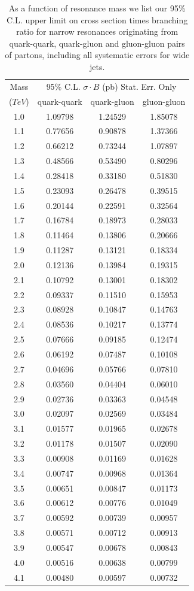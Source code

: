 \begin{table}[htbH]
\centering
\large
\begin{tabular}{|c|c|c|c|}\hline
Mass   &  \multicolumn{3}{c|}{95\% C.L. $\sigma\cdot B$ (pb) Stat. Err. Only}\\
 ($TeV$) & quark-quark       & quark-gluon  & gluon-gluon\\ \hline
1.0 & 1.09798 & 1.24529 & 1.85078 \\
1.1 & 0.77656 & 0.90878 & 1.37366 \\
1.2 & 0.66212 & 0.73244 & 1.07897 \\
1.3 & 0.48566 & 0.53490 & 0.80296 \\
1.4 & 0.28418 & 0.33180 & 0.51830 \\
1.5 & 0.23093 & 0.26478 & 0.39515 \\
1.6 & 0.20144 & 0.22591 & 0.32564 \\
1.7 & 0.16784 & 0.18973 & 0.28033 \\
1.8 & 0.11464 & 0.13806 & 0.20666 \\
1.9 & 0.11287 & 0.13121 & 0.18334 \\
2.0 & 0.12136 & 0.13984 & 0.19315 \\
2.1 & 0.10792 & 0.13001 & 0.18302 \\
2.2 & 0.09337 & 0.11510 & 0.15953 \\
2.3 & 0.08928 & 0.10847 & 0.14763 \\
2.4 & 0.08536 & 0.10217 & 0.13774 \\
2.5 & 0.07666 & 0.09185 & 0.12474 \\
2.6 & 0.06192 & 0.07487 & 0.10108 \\
2.7 & 0.04696 & 0.05766 & 0.07810 \\
2.8 & 0.03560 & 0.04404 & 0.06010 \\
2.9 & 0.02736 & 0.03363 & 0.04548 \\
3.0 & 0.02097 & 0.02569 & 0.03484 \\
3.1 & 0.01577 & 0.01965 & 0.02678 \\
3.2 & 0.01178 & 0.01507 & 0.02090 \\
3.3 & 0.00908 & 0.01169 & 0.01628 \\
3.4 & 0.00747 & 0.00968 & 0.01364 \\
3.5 & 0.00651 & 0.00847 & 0.01173 \\
3.6 & 0.00612 & 0.00776 & 0.01049 \\
3.7 & 0.00592 & 0.00739 & 0.00957 \\
3.8 & 0.00571 & 0.00712 & 0.00913 \\
3.9 & 0.00547 & 0.00678 & 0.00843 \\
4.0 & 0.00516 & 0.00638 & 0.00799 \\
4.1 & 0.00480 & 0.00597 & 0.00732 \\
\hline
\end{tabular}
\caption{As a function of resonance mass we list our 95\% C.L. upper limit on
cross section times branching ratio for narrow resonances originating from
quark-quark, quark-gluon and gluon-gluon pairs of partons, 
including all systematic errors for wide jets.}
\label{tabSysLimit_calo}
\end{table}

